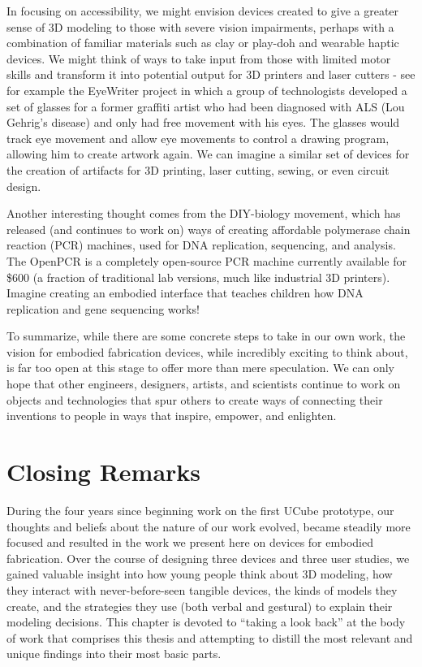 In focusing on accessibility, we might envision devices created to give a
greater sense of 3D modeling to those with severe vision impairments, perhaps
with a combination of familiar materials such as clay or play-doh and wearable
haptic devices. We might think of ways to take input from those with limited
motor skills and transform it into potential output for 3D printers and laser
cutters - see for example the EyeWriter project\cite{EyeWriter} in which a group
of technologists developed a set of glasses for a former graffiti artist who had
been diagnosed with ALS (Lou Gehrig's disease) and only had free movement with
his eyes. The glasses would track eye movement and allow eye movements to
control a drawing program, allowing him to create artwork again. We can imagine
a similar set of devices for the creation of artifacts for 3D printing, laser
cutting, sewing, or even circuit design.

Another interesting thought comes from the DIY-biology movement, which has
released (and continues to work on) ways of creating affordable polymerase chain
reaction (PCR) machines, used for DNA replication, sequencing, and analysis. The
OpenPCR\cite{OpenPCR} is a completely open-source PCR machine currently
available for \$600 (a fraction of traditional lab versions, much like
industrial 3D printers). Imagine creating an embodied interface that teaches
children how DNA replication and gene sequencing works!

To summarize, while there are some concrete steps to take in our own work, the
vision for embodied fabrication devices, while incredibly exciting to think
about, is far too open at this stage to offer more than mere speculation. We can
only hope that other engineers, designers, artists, and scientists continue to
work on objects and technologies that spur others to create ways of
connecting their inventions to people in ways that inspire, empower, and
enlighten.

\section{Closing Remarks}

During the four years since beginning work on the first UCube prototype, our
thoughts and beliefs about the nature of our work evolved, became steadily more
focused and resulted in the work we present here on devices for embodied
fabrication. Over the course of designing three devices and three user studies,
we gained valuable insight into how young people think about 3D modeling, how they
interact with never-before-seen tangible devices, the kinds of models they
create, and the strategies they use (both verbal and gestural) to explain their
modeling decisions. This chapter is devoted to ``taking a look back'' at the
body of work that comprises this thesis and attempting to distill the most
relevant and unique findings into their most basic parts.

